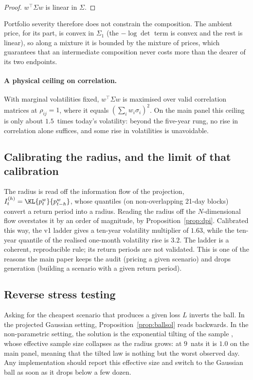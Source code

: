 \begin{proof}
$w^\top\Sigma w$ is linear in $\Sigma$.
\end{proof}

Portfolio severity therefore does not constrain the composition. The ambient
price, for its part, is convex in $\Sigma_1$ (the $-\log\det$ term is convex and
the rest is linear), so along a mixture it is bounded by the mixture of prices,
which guarantees that an intermediate composition never costs more than the
dearer of its two endpoints.

\paragraph{A physical ceiling on correlation.} With marginal volatilities fixed,
$w^\top\Sigma w$ is maximised over valid correlation matrices at
$\rho_{ij}=1$, where it equals $(\sum_iw_i\sigma_i)^2$. On the main panel this
ceiling is only about $1.5$~times today's volatility: beyond the five-year rung,
no rise in correlation alone suffices, and some rise in volatilities is
unavoidable.

\subsection{Calibrating the radius, and the limit of that calibration}

The radius is read off the information flow of the projection,
$I^{(h)}_t=\KL{p^w_t}{p^w_{t-h}}$, whose quantiles (on non-overlapping 21-day
blocks) convert a return period into a radius. Reading the radius off the
$N$-dimensional flow overstates it by an order of magnitude, by
Proposition~\ref{prop:dpi}. Calibrated this way, the v1 ladder gives a ten-year
volatility multiplier of $1.63$, while the ten-year quantile of the realised
one-month volatility rise is $3.2$. The ladder is a coherent, reproducible rule;
its return periods are not validated. This is one of the reasons the main paper
keeps the audit (pricing a given scenario) and drops generation (building a
scenario with a given return period).

\subsection{Reverse stress testing}

Asking for the cheapest scenario that produces a given loss $L$ inverts the ball.
In the projected Gaussian setting, Proposition~\ref{prop:ballsol} reads
backwards. In the non-parametric setting, the solution is the exponential
tilting of the sample \citep{csiszar1975}, whose effective sample size collapses
as the radius grows: at $9$~nats it is $1.0$ on the main panel, meaning that the
tilted law is nothing but the worst observed day. Any implementation should
report this effective size and switch to the Gaussian ball as soon as it drops
below a few dozen.

